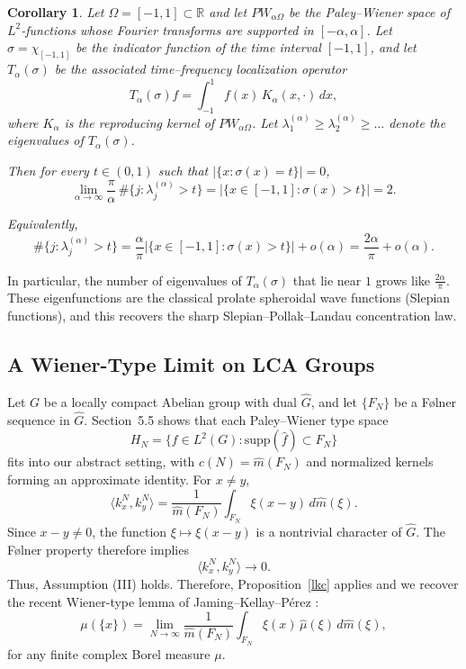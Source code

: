 \documentclass{amsart}
\newtheorem{cor}[thm]{Corollary}
\theoremstyle{definition}
\theoremstyle{remark}
\numberwithin{equation}{section}
\begin{document}
\begin{cor}
\label{cor:slepian}
Let $\Omega=[-1,1]\subset\mathbb{R}$ and let $PW_{\alpha\Omega}$ be the Paley--Wiener
space of $L^{2}$-functions whose Fourier transforms are supported in $[-\alpha,\alpha]$.
Let $\sigma=\chi_{[-1,1]}$ be the indicator function of the time interval $[-1,1]$,
and let $T_{\alpha}(\sigma)$ be the associated time--frequency localization operator
\[
T_{\alpha}(\sigma) f 
=
\int_{-1}^{1} f(x)\, K_{\alpha}(x,\cdot) \, dx,
\]
where $K_{\alpha}$ is the reproducing kernel of $PW_{\alpha\Omega}$.
Let $\lambda^{(\alpha)}_{1}\ge \lambda^{(\alpha)}_{2}\ge \dots$ 
denote the eigenvalues of $T_{\alpha}(\sigma)$.

Then for every $t\in(0,1)$ such that $|\{x:\sigma(x)=t\}|=0$, 
\[
\lim_{\alpha\to\infty}
\frac{\pi}{\alpha}\,
\#\{j:\lambda^{(\alpha)}_{j}>t\}
=
|\{x\in[-1,1]:\sigma(x)>t\}|
=
2.
\]

Equivalently,
\[
\#\{j:\lambda^{(\alpha)}_{j}>t\}
=
\frac{\alpha}{\pi}\left|\{x\in[-1,1]:\sigma(x)>t\}\right|
+o(\alpha)
=
\frac{2\alpha}{\pi}+o(\alpha).
\]
\end{cor}

In particular, the number of eigenvalues of $T_{\alpha}(\sigma)$
that lie near $1$ grows like $\frac{2\alpha}{\pi}$.
These eigenfunctions are the classical prolate spheroidal wave functions (Slepian functions),
and this recovers the sharp Slepian--Pollak--Landau concentration law.


\subsection{A Wiener-Type Limit on LCA Groups}
Let $G$ be a locally compact Abelian group with dual $\widehat{G}$, and let $\{F_N\}$ be a Følner sequence in $\widehat{G}$.  
Section~5.5 shows that each Paley--Wiener type space 
\[
H_N = \{f\in L^{2}(G): \mathrm{supp}(\widehat{f})\subset F_N\}
\]
fits into our abstract setting, with $c(N)=\widehat{m}(F_N)$ and normalized kernels forming an approximate identity. For \(x\neq y\),
\[
\langle k_x^N,k_y^N\rangle
=
\frac{1}{\widehat m(F_N)}
\int_{F_N}\xi(x-y)\,d\widehat m(\xi).
\]
Since \(x-y\neq0\), the function
\(\xi\mapsto\xi(x-y)\) is a nontrivial character of \(\widehat G\).
The Følner property therefore implies
\[
\langle k_x^N,k_y^N\rangle\longrightarrow0.
\]
Thus, Assumption (III) holds. Therefore, Proposition~\ref{lkc} applies and 
we recover the recent Wiener-type lemma of Jaming--Kellay--Pérez \cite{jaming2026wiener}:
\[
\mu(\{x\})
=
\lim_{N\to\infty}
\frac{1}{\widehat{m}(F_N)}
\int_{F_N} \xi(x)\,\widehat{\mu}(\xi)\, d\widehat{m}(\xi),
\]
for any finite complex Borel measure $\mu$.
\end{document}
